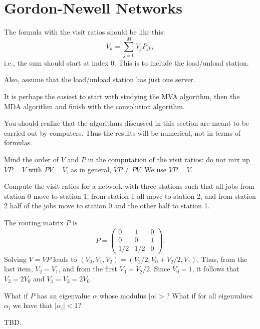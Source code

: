 
\section{Gordon-Newell Networks}
\label{sec:gordonNewell}


The formula with the visit ratios should be like this:
\begin{equation*}
  V_k = \sum_{j=0}^M V_j P_{jk}, 
\end{equation*}
i.e., the sum should start at index 0. This is to include the
load/unload station.

Also, assume that the load/unload station has just one server.

It is perhaps the easiest to start with studying the MVA algorithm,
then the MDA algorithm and finish with the convolution algorithm.

You should realize that the algorithms discussed in this section are
meant to be carried out by computers. Thus the results will be
numerical, not in terms of formulas.

Mind the order of $V$ and $P$ in the computation of the visit ratios:
do not mix up $VP=V$ with $PV=V$, as in general, $VP \neq PV$.  We use
$VP=V$.


\begin{question}\label{ex:mva}
  Compute the visit ratios for a network with three stations such that all jobs from station 0 move to station 1, from station 1 all move to station 2, and from station 2 half of the jobs move to station 0 and the other half to station 1. 
  \begin{solution}
    The routing matrix $P$ is
    \begin{equation*}
      P = 
      \begin{pmatrix}
        0 & 1 & 0 \\
0& 0 & 1 \\
1/2 & 1/2 & 0
      \end{pmatrix}.
    \end{equation*}
    Solving $V=VP$ leads to
    $(V_0, V_1, V_2) = (V_2/2, V_0 + V_2/2, V_1)$. Thus, from the last
    item, $V_2 = V_1$, and from the first $V_0 = V_2/2$. Since
    $V_0=1$, it follows that $V_2 = 2V_0$ and $V_1=V_2=2 V_0$.
  \end{solution}
\end{question}

\begin{question}
  What if $P$ has an eigenvalue $\alpha$ whose modulus $|\alpha|>$? What if for all eigenvalues $\alpha_i$ we have that $|\alpha_i|<1$?
  \begin{solution}
    TBD.
  \end{solution}
\end{question}

